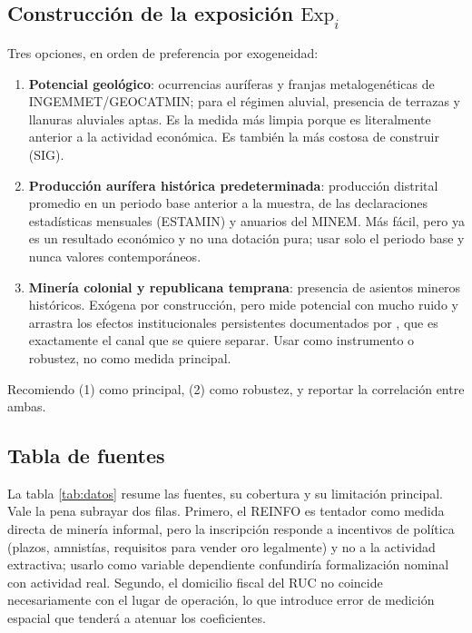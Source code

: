 \documentclass[11pt,a4paper]{article}
\newcommand{\Exp}{\mathrm{Exp}}
\begin{document}
\subsection{Construcción de la exposición $\Exp_i$}

Tres opciones, en orden de preferencia por exogeneidad:
\begin{enumerate}[leftmargin=1.6em,itemsep=1pt]
\item \textbf{Potencial geológico}: ocurrencias auríferas y franjas metalogenéticas de INGEMMET/\allowbreak GEOCATMIN; para el régimen aluvial, presencia de terrazas y llanuras aluviales aptas. Es la medida más limpia porque es literalmente anterior a la actividad económica. Es también la más costosa de construir (SIG).
\item \textbf{Producción aurífera histórica predeterminada}: producción distrital promedio en un periodo base anterior a la muestra, de las declaraciones estadísticas mensuales (ESTAMIN) y anuarios del MINEM. Más fácil, pero ya es un resultado económico y no una dotación pura; usar solo el periodo base y nunca valores contemporáneos.
\item \textbf{Minería colonial y republicana temprana}: presencia de asientos mineros históricos. Exógena por construcción, pero mide potencial con mucho ruido y arrastra los efectos institucionales persistentes documentados por \citet{dell2010}, que es exactamente el canal que se quiere separar. Usar como instrumento o robustez, no como medida principal.
\end{enumerate}
Recomiendo (1) como principal, (2) como robustez, y reportar la correlación entre ambas.

\subsection{Tabla de fuentes}

La tabla \ref{tab:datos} resume las fuentes, su cobertura y su limitación principal. Vale la pena subrayar dos filas. Primero, el REINFO es tentador como medida directa de minería informal, pero la inscripción responde a incentivos de política (plazos, amnistías, requisitos para vender oro legalmente) y no a la actividad extractiva; usarlo como variable dependiente confundiría formalización nominal con actividad real. Segundo, el domicilio fiscal del RUC no coincide necesariamente con el lugar de operación, lo que introduce error de medición espacial que tenderá a atenuar los coeficientes.
\end{document}
